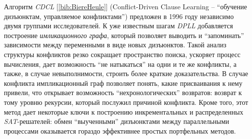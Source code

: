Алгоритм \textit{CDCL} [\ref{bib:BiereHeule}] (Conflict-Driven Clause Learning -- \enquote{обучение дизъюнктам, управляемое конфликтами}) предложен в 1996 году независимо двумя группами исследователей. К уже известным шагам \textit{DPLL} добавляется построение \textit{имликационного графа}, который позволяет выводить и \enquote{запоминать} зависимости между переменными в виде новых дизъюнктов. Такой анализ структуры конфликтов резко сокращает пространство поиска, ускоряет процесс вычисления, дает возможность \enquote{не натыкаться} на одни и те же конфликты, а также, в случае невыполнимости, строить более краткие доказательства. В случае конфликта импликационный граф позволяет понять, какие присваивания к нему привели, что открывает возможность \enquote{нехронологических} возвратов: возврат к тому уровню рекурсии, который послужил причиной конфликта. Кроме того, этот метод дает некоторые ключи к построению инкрементальных и распределенных \textit{SAT}-решателей: обмен \enquote{выученными} дизъюнктами между параллельными процессами оказывается гораздо эффективнее простых портфельных методов.

